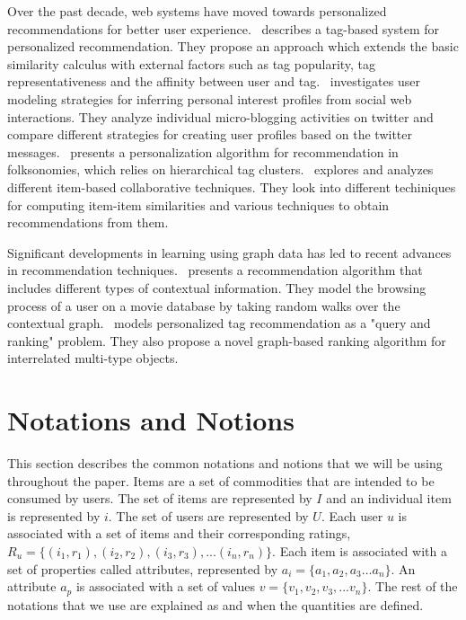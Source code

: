 \documentclass{acm_proc_article-sp}
\begin{document}
Over the past decade, web systems have moved towards personalized recommendations for better user experience.~\cite{durao} describes a tag-based system for personalized recommendation. They propose an approach which extends the basic similarity calculus
with external factors such as tag popularity, tag representativeness and the affinity between user and tag.~\cite{fabian} investigates user modeling strategies for inferring personal interest profiles from social web interactions. They analyze individual micro-blogging activities on twitter and compare different strategies for creating user profiles based on the twitter messages.~\cite{andriy} presents a personalization algorithm for recommendation in folksonomies, which relies on hierarchical tag clusters.~\cite{sarwar} explores and analyzes different item-based collaborative techniques. They look into different techiniques for computing item-item similarities and various techniques to obtain recommendations from them.

Significant developments in learning using graph data has led to recent advances in recommendation techniques.~\cite{toine} presents a recommendation algorithm that includes different types of contextual information. They model the browsing process of a user on a movie database by taking random walks over the contextual graph.~\cite{ziyu} models personalized tag recommendation as a "query and ranking" problem. They also propose a novel graph-based ranking algorithm for interrelated multi-type objects.

\section{Notations and Notions}
\label{sec:notions}
This section describes the common notations and notions that we will be using throughout the paper. Items are a set of commodities that are intended to be consumed by users. The set of items are represented by $I$ and an individual item is represented by $i$. The set of users are represented by $U$. Each user $u$ is associated with a set of items and their corresponding ratings, $R_u = \{(i_1, r_1), (i_2, r_2), (i_3, r_3), ... (i_n, r_n)\}$. Each item is associated with a set of properties called attributes, represented by $a_i = \{a_1, a_2, a_3 ... a_n\}$. An attribute $a_p$ is associated with a set of values $v = \{v_1, v_2, v_3, ... v_n\}$. The rest of the notations that we use are explained as and when the quantities are defined.
\end{document}
